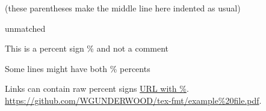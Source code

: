 \documentclass{article}
\begin{document}
(these parentheses
make the middle line here
indented as usual)


unmatched %

This is a percent sign \% and not a comment

Some lines might have both \% percents %

Links can contain raw percent signs
\href{https://github.com/WGUNDERWOOD/tex-fmt/example%20file.pdf}{URL with \%}.
\url{https://github.com/WGUNDERWOOD/tex-fmt/example%20file.pdf}.
\end{document}
